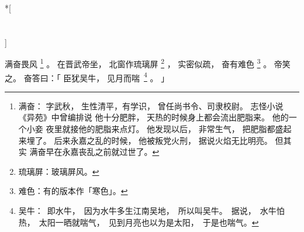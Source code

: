 
\switchcolumn[0]*[\section{}]

满奋畏风%
\footnote{%
    满奋：
        字武秋，
        生性清平，有学识，
        曾任尚书令、司隶校尉。
        志怪小说《异苑》中曾编排说
        他十分肥胖，
        天热的时候身上都会流出肥脂来。
        他的一个小妾
        夜里就接他的肥脂来点灯。
        他发现以后，
        非常生气，
        把肥脂都盛起来埋了。
        后来永嘉之乱的时候，
        他被叛党火刑，
        据说火焰无比明亮。
        但其实
        满奋早在永嘉丧乱之前就过世了。
}%
。
在晋武帝坐，
北窗作琉璃屏%
\footnote{%
    琉璃屏：玻璃屏风。
}%
，
实密似疏，
奋有难色%
\footnote{%
    难色：有的版本作「寒色」。
}%
。
帝笑之。
奋答曰：「
    臣犹吴牛，
    见月而\mbox{喘%
    \footnote{%
        吴牛：
            即水牛，
            因为水牛多生江南吴地，
            所以叫吴牛。
            据说，
            水牛怕热，
            太阳一晒就喘气，
            见到月亮也以为是太阳，
            于是也喘气。
    }}%
    。
」

\switchcolumn


